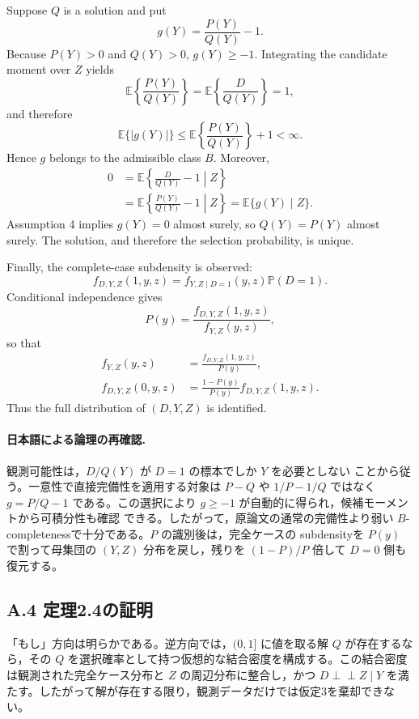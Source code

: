 \documentclass[10pt,a4paper]{article}
\newcommand{\indep}{\mathrel{\perp\!\!\!\perp}}
\newcommand{\E}{\mathbb{E}}
\newcommand{\Prb}{\mathbb{P}}
\begin{document}
Suppose $Q$ is a solution and put
\[
 g(Y)=\frac{P(Y)}{Q(Y)}-1.
\]
Because $P(Y)>0$ and $Q(Y)>0$, $g(Y)\geq-1$. Integrating the candidate
moment over $Z$ yields
\[
 \E\left\{\frac{P(Y)}{Q(Y)}\right\}
 =\E\left\{\frac{D}{Q(Y)}\right\}=1,
\]
and therefore
\[
 \E\{|g(Y)|\}
 \leq \E\left\{\frac{P(Y)}{Q(Y)}\right\}+1<\infty.
\]
Hence $g$ belongs to the admissible class $B$. Moreover,
\begin{align*}
 0
 &=\E\left\{\frac{D}{Q(Y)}-1\middle|Z\right\}\\
 &=\E\left\{\frac{P(Y)}{Q(Y)}-1\middle|Z\right\}
 =\E\{g(Y)\mid Z\}.
\end{align*}
Assumption 4 implies $g(Y)=0$ almost surely, so $Q(Y)=P(Y)$ almost
surely. The solution, and therefore the selection probability, is
unique.

Finally, the complete-case subdensity is observed:
\[
 f_{D,Y,Z}(1,y,z)=f_{Y,Z\mid D=1}(y,z)\Prb(D=1).
\]
Conditional independence gives
\[
 P(y)=\frac{f_{D,Y,Z}(1,y,z)}{f_{Y,Z}(y,z)},
\]
so that
\begin{align*}
 f_{Y,Z}(y,z)
 &=\frac{f_{D,Y,Z}(1,y,z)}{P(y)},\\
 f_{D,Y,Z}(0,y,z)
 &=\frac{1-P(y)}{P(y)}f_{D,Y,Z}(1,y,z).
\end{align*}
Thus the full distribution of $(D,Y,Z)$ is identified.

\paragraph{日本語による論理の再確認.}
観測可能性は，$D/Q(Y)$ が $D=1$ の標本でしか $Y$ を必要としない
ことから従う。一意性で直接完備性を適用する対象は $P-Q$ や
$1/P-1/Q$ ではなく $g=P/Q-1$ である。この選択により
$g\geq-1$ が自動的に得られ，候補モーメントから可積分性も確認
できる。したがって，原論文の通常の完備性より弱い
$B$-completenessで十分である。$P$ の識別後は，完全ケースの
subdensityを $P(y)$ で割って母集団の $(Y,Z)$ 分布を戻し，残りを
$(1-P)/P$ 倍して $D=0$ 側も復元する。

\subsection*{A.4 定理2.4の証明}

「もし」方向は明らかである。逆方向では，$(0,1]$ に値を取る解 $Q$ が存在するなら，その $Q$ を選択確率として持つ仮想的な結合密度を構成する。この結合密度は観測された完全ケース分布と $Z$ の周辺分布に整合し，かつ $D\indep Z\mid Y$ を満たす。したがって解が存在する限り，観測データだけでは仮定3を棄却できない。
\end{document}
